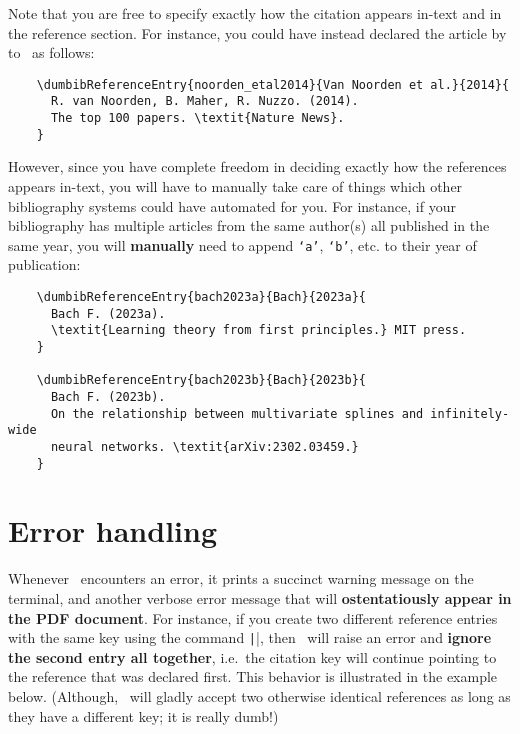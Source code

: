 \documentclass[letter, 11pt]{article}
\begin{document}


  Note that you are free to specify exactly how the citation appears in-text and in the reference section. For instance, you could have instead declared the article  by \cite{noorden_etal2014} to \dumbib\ as follows:
  \begin{verbatim}
    \dumbibReferenceEntry{noorden_etal2014}{Van Noorden et al.}{2014}{
      R. van Noorden, B. Maher, R. Nuzzo. (2014).
      The top 100 papers. \textit{Nature News}.
    }
  \end{verbatim}
  However, since you have complete freedom in deciding exactly how the references appears in-text, you will have to manually take care of things which other bibliography systems could have automated for you. For instance, if your bibliography has multiple articles from the same author(s) all published in the same year, you will \textbf{manually} need to append \texttt{`a'}, \texttt{`b'}, etc. to their year of publication:
  \begin{verbatim}
    \dumbibReferenceEntry{bach2023a}{Bach}{2023a}{
      Bach F. (2023a).
      \textit{Learning theory from first principles.} MIT press.
    }
    
    \dumbibReferenceEntry{bach2023b}{Bach}{2023b}{
      Bach F. (2023b).
      On the relationship between multivariate splines and infinitely-wide
      neural networks. \textit{arXiv:2302.03459.}
    }
  \end{verbatim}
    
  
  
  \section{Error handling}
  Whenever \dumbib\ encounters an error, it prints a succinct warning message on the terminal, and another verbose error message that will \textbf{ostentatiously appear in the PDF document}. For instance, if you create two different reference entries with the same key using the command \texttt|\dumbibReferenceEntry{}|, then \dumbib\ will raise an error and \textbf{ignore the second entry all together}, i.e.\ the citation key will continue pointing to the reference that was declared first. This behavior is illustrated in the example below. (Although, \dumbib\ will gladly accept two otherwise identical references as long as they have a different key; it is really dumb!)
\end{document}
